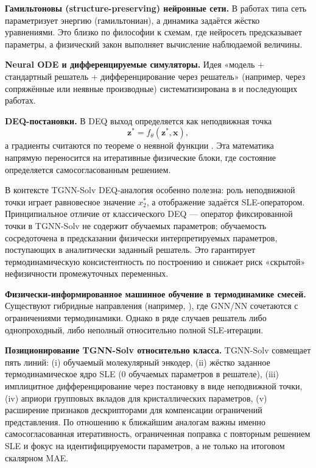 \documentclass[11pt]{article}
\begin{document}
\textbf{Гамильтоновы (structure-preserving) нейронные сети.} В работах типа \cite{greydanus2019} сеть параметризует энергию (гамильтониан), а динамика задаётся жёстко уравнениями. Это близко по философии к схемам, где нейросеть предсказывает параметры, а физический закон выполняет вычисление наблюдаемой величины.

\textbf{Neural ODE и дифференцируемые симуляторы.} Идея «модель + стандартный решатель + дифференцирование через решатель» (например, через сопряжённые или неявные производные) систематизирована в \cite{chen2018} и последующих работах.

\textbf{DEQ-постановки.} В DEQ выход определяется как неподвижная точка
\begin{equation*}
\mathbf{z}^*=f_\theta(\mathbf{z}^*,\mathbf{x}),
\end{equation*}
а градиенты считаются по теореме о неявной функции \cite{bai2019}. Эта математика напрямую переносится на итеративные физические блоки, где состояние определяется самосогласованным решением.

В контексте TGNN-Solv DEQ-аналогия особенно полезна: роль неподвижной точки играет равновесное значение $x_2^*$, а отображение задаётся SLE-оператором. Принципиальное отличие от классического DEQ --- оператор фиксированной точки в TGNN-Solv не содержит обучаемых параметров; обучаемость сосредоточена в предсказании физически интерпретируемых параметров, поступающих в аналитически заданный решатель. Это гарантирует термодинамическую консистентность по построению и снижает риск «скрытой» нефизичности промежуточных переменных.

\textbf{Физически-информированное машинное обучение в термодинамике смесей.} Существуют гибридные направления (например, \cite{lim2022,winter2022,sanchezmedina2023}), где GNN/NN сочетаются с ограничениями термодинамики. Однако в ряде случаев решатель либо однопроходный, либо неполный относительно полной SLE-итерации.

\textbf{Позиционирование TGNN-Solv относительно класса.} TGNN-Solv совмещает пять линий: (i) обучаемый молекулярный энкодер, (ii) жёстко заданное термодинамическое ядро SLE (0 обучаемых параметров в решателе), (iii) имплицитное дифференцирование через постановку в виде неподвижной точки, (iv) априори групповых вкладов для кристаллических параметров, (v) расширение признаков дескрипторами для компенсации ограничений представления. По отношению к ближайшим аналогам важны именно самосогласованная итеративность, ограниченная поправка с повторным решением SLE и фокус на идентифицируемости параметров, а не только на итоговом скалярном MAE.
\end{document}
